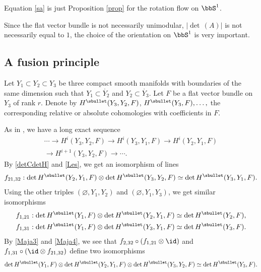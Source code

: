 \begin{re}
Equation \eqref{sa} is just Proposition \ref{prop} for the rotation flow on $\bbS^{1}$.
\end{re}

\begin{re}
Since the flat vector bundle is not necessarily unimodular, \ie $|{\det\,}(A)|$ is
not necessarily equal to $1$, the choice of the
orientation on $\bbS^{1}$ is very important.
\end{re}

\subsection{A fusion principle}\label{Fp}
Let $Y_{1}\subset Y_{2}\subset Y_{3}$ be three compact smooth
manifolds with boundaries of
the same dimension such that $Y_{1}\subset \mathring{Y_{2}}$ and
$Y_{2}\subset \mathring{Y_{3}}$. Let $F$ be a flat vector bundle on
$Y_{3}$ of rank $r$. Denote by $H^{\sbullet}(Y_{3},Y_{2},F)$,
$H^{\sbullet}(Y_{3},F), \ldots,$ the corresponding relative or absolute
cohomologies with coefficients in $F$.

As in \cite[(0.16)]{BruningMa_2012}, we have a long exact sequence
\begin{multline}\label{Les}
\cdots\to H^{i}(Y_{3},Y_{2},F)\to H^{i}(Y_{3},Y_{1},F)\to
H^{i}(Y_{2},Y_{1},F)\\
\to H^{i+1}(Y_{3},Y_{2},F) \to \cdots.
\end{multline}
By \eqref{detCdetH} and \eqref{Les}, we get an isomorphism of lines
\begin{equation}\label{Maja3}
f_{21,32 }:\det H^{\sbullet}(Y_{2},Y_{1},F)\otimes \det H^{\sbullet}(Y_{3},Y_{2},F)\simeq \det H^{\sbullet}(Y_{3},Y_{1},F).
\end{equation}
Using the other triples $(\varnothing,Y_{1},Y_{2})$ and
$(\varnothing,Y_{1},Y_{3})$, we get similar isomorphisms
\begin{equation}\label{Maja4}
\begin{aligned}
f_{1,21}: \det H^{\sbullet}(Y_{1},F)\otimes \det
H^{\sbullet}(Y_{2},Y_{1},F)\simeq \det H^{\sbullet}(Y_{2},F),\\
f_{1,31}: \det H^{\sbullet}(Y_{1},F)\otimes \det
H^{\sbullet}(Y_{3},Y_{1},F)\simeq \det H^{\sbullet}(Y_{3},F).
\end{aligned}
\end{equation}
By \eqref{Maja3} and \eqref{Maja4}, we see that
$f_{2,32}\circ(f_{1,21}\otimes\id) $ and $f_{1,31}\circ (\id \otimes f_{21,32})$
define two isomorphisms
\begin{equation}\label{FYYY}
\det H^{\sbullet}(Y_{1},F)\otimes \det H^{\sbullet}(Y_{2},Y_{1},F)\otimes \det
H^{\sbullet}(Y_{3},Y_{2},F) \simeq \det H^{\sbullet}(Y_{3},F).
\end{equation}

